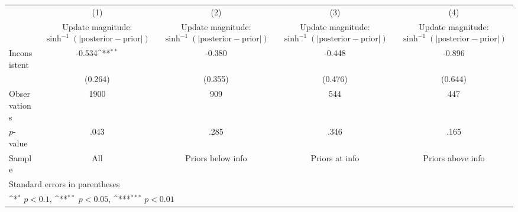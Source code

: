 {
\def\sym#1{\ifmmode^{#1}\else\(^{#1}\)\fi}
\begin{tabular}{l*{4}{c}}
\hline\hline
                    &\multicolumn{1}{c}{(1)}         &\multicolumn{1}{c}{(2)}         &\multicolumn{1}{c}{(3)}         &\multicolumn{1}{c}{(4)}         \\
                    &\shortstack{Update magnitude: \\ $ \sinh^{-1}(|\text{posterior}-\text{prior} |) $}         &\shortstack{Update magnitude: \\ $ \sinh^{-1}(|\text{posterior}-\text{prior} |) $}         &\shortstack{Update magnitude: \\ $ \sinh^{-1}(|\text{posterior}-\text{prior} |) $}         &\shortstack{Update magnitude: \\ $ \sinh^{-1}(|\text{posterior}-\text{prior} |) $}         \\
\hline
Inconsistent        &      -0.534\sym{**} &      -0.380         &      -0.448         &      -0.896         \\
                    &     (0.264)         &     (0.355)         &     (0.476)         &     (0.644)         \\
\hline
Observations        &        1900         &         909         &         544         &         447         \\
$p$-value           &        .043         &        .285         &        .346         &        .165         \\
Sample              &         All         &Priors below info         &Priors at info         &Priors above info         \\
\hline\hline
\multicolumn{5}{l}{\footnotesize Standard errors in parentheses}\\
\multicolumn{5}{l}{\footnotesize \sym{*} \(p<0.1\), \sym{**} \(p<0.05\), \sym{***} \(p<0.01\)}\\
\end{tabular}
}
